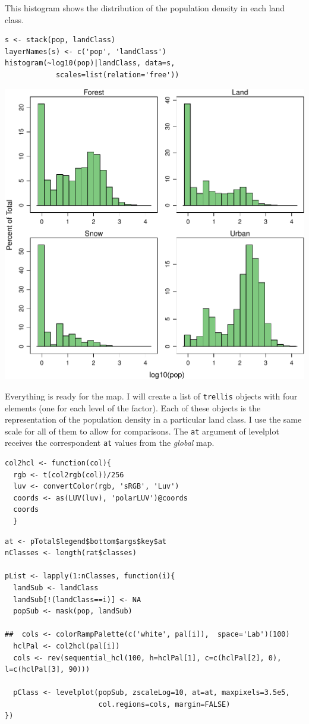 This histogram shows the distribution of the population density in each land class.


\lstset{language=R}
\begin{lstlisting}
s <- stack(pop, landClass)
layerNames(s) <- c('pop', 'landClass')
histogram(~log10(pop)|landClass, data=s,
            scales=list(relation='free'))
\end{lstlisting}

\includegraphics[width=.9\linewidth]{figs/histogramLandClass.pdf}

Everything is ready for the map. I will create a list of \texttt{trellis}
objects with four elements (one for each level of the factor). Each of
these objects is the representation of the population density in a
particular land class.  I use the same scale for all of them to allow
for comparisons. The \texttt{at} argument of levelplot receives the
correspondent \texttt{at} values from the \emph{global} map.


\lstset{language=R}
\begin{lstlisting}
col2hcl <- function(col){
  rgb <- t(col2rgb(col))/256
  luv <- convertColor(rgb, 'sRGB', 'Luv')
  coords <- as(LUV(luv), 'polarLUV')@coords
  coords
  }
\end{lstlisting}


\lstset{language=R}
\begin{lstlisting}
at <- pTotal$legend$bottom$args$key$at
nClasses <- length(rat$classes)

pList <- lapply(1:nClasses, function(i){
  landSub <- landClass
  landSub[!(landClass==i)] <- NA
  popSub <- mask(pop, landSub)

##  cols <- colorRampPalette(c('white', pal[i]),  space='Lab')(100)
  hclPal <- col2hcl(pal[i])
  cols <- rev(sequential_hcl(100, h=hclPal[1], c=c(hclPal[2], 0), l=c(hclPal[3], 90)))

  pClass <- levelplot(popSub, zscaleLog=10, at=at, maxpixels=3.5e5,
                      col.regions=cols, margin=FALSE)
})
\end{lstlisting}


